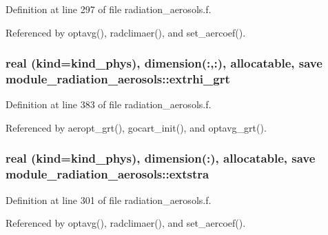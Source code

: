 Definition at line 297 of file radiation\+\_\+aerosols.\+f.



Referenced by optavg(), radclimaer(), and set\+\_\+aercoef().

\subsubsection[{\texorpdfstring{extrhi\+\_\+grt}{extrhi_grt}}]{\setlength{\rightskip}{0pt plus 5cm}real (kind=kind\+\_\+phys), dimension(\+:,\+:), allocatable, save module\+\_\+radiation\+\_\+aerosols\+::extrhi\+\_\+grt\hspace{0.3cm}{\ttfamily [private]}}\hypertarget{namespacemodule__radiation__aerosols_acb7ff037be78e950ea42d956816c93d5}{}\label{namespacemodule__radiation__aerosols_acb7ff037be78e950ea42d956816c93d5}


Definition at line 383 of file radiation\+\_\+aerosols.\+f.



Referenced by aeropt\+\_\+grt(), gocart\+\_\+init(), and optavg\+\_\+grt().

\subsubsection[{\texorpdfstring{extstra}{extstra}}]{\setlength{\rightskip}{0pt plus 5cm}real (kind=kind\+\_\+phys), dimension(\+:), allocatable, save module\+\_\+radiation\+\_\+aerosols\+::extstra\hspace{0.3cm}{\ttfamily [private]}}\hypertarget{namespacemodule__radiation__aerosols_ac0c59f22f472671cd86221cc1ed46c60}{}\label{namespacemodule__radiation__aerosols_ac0c59f22f472671cd86221cc1ed46c60}


Definition at line 301 of file radiation\+\_\+aerosols.\+f.



Referenced by optavg(), radclimaer(), and set\+\_\+aercoef().

